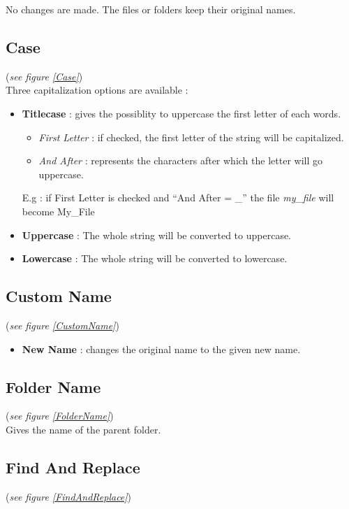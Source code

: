 \documentclass[11pt, a4paper]{scrartcl}
\begin{document}
No changes are made. The files or folders keep their original names.

\subsection*{Case}
(\emph{see figure \ref{Case}})\\

Three capitalization options are available :
\begin{itemize}
        \item \textbf{Titlecase} : gives the possiblity to uppercase the first letter of each words.
                \begin{itemize}
                        \item \emph{First Letter} : if checked, the first letter of the string will be capitalized. 
                        \item \emph{And After} : represents the characters after which the letter will go uppercase. 
                \end{itemize}
                E.g : if First Letter is checked and ``And After = \_'' the file \emph{my\_file} will become My\_File
        \item \textbf{Uppercase} : The whole string will be converted to uppercase.
        \item \textbf{Lowercase} : The whole string will be converted to lowercase.
\end{itemize}

\subsection*{Custom Name}
(\emph{see figure \ref{CustomName}})\\

\begin{itemize}
        \item \textbf{New Name} : changes the original name to the given new name.
\end{itemize}

\subsection*{Folder Name}
(\emph{see figure \ref{FolderName}})\\

Gives the name of the parent folder.

\subsection*{Find And Replace}
(\emph{see figure \ref{FindAndReplace}})\\
\end{document}
